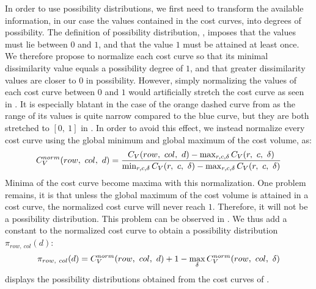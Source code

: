 In order to use possibility distributions, we first need to transform the available information, in our case the values contained in the cost curves, into degrees of possibility. The definition of possibility distribution, , imposes that the values must lie between $0$ and $1$, and that the value $1$ must be attained at least once. We therefore propose to normalize each cost curve so that its minimal dissimilarity value equals a possibility degree of $1$, and that greater dissimilarity values are closer to $0$ in possibility. However, simply normalizing the values of each cost curve between $0$ and $1$ would artificially stretch the cost curve as seen in . It is especially blatant in the case of the orange dashed curve from  as the range of its values is quite narrow compared to the blue curve, but they are both stretched to $[0,~1]$ in . In order to avoid this effect, we instead normalize every cost curve using the global minimum and global maximum of the cost volume, as:
\begin{align}
	C_V^{norm}(row, ~col, ~d) = \dfrac{C_V(row, ~col, ~d) - \max_{r,c,\delta}C_V(r,~c,~\delta)}{\min_{r,c,\delta}C_V(r,~c,~\delta) - \max_{r,c,\delta}C_V(r,~c,~\delta)}\label{eq:normalized_cost_curve}
\end{align}
Minima of the cost curve become maxima with this normalization. One problem remains, it is that unless the global maximum of the cost volume is attained in a cost curve, the normalized cost curve will never reach $1$. Therefore, it will not be a possibility distribution. This problem can be observed in . We thus add a constant to the normalized cost curve to obtain a possibility distribution $\pi_{row,~col}(d)$:
\begin{align}
	\pi_{row,~col}(d) = C_V^{norm}(row, ~col, ~d) + 1 - \max_\delta C_V^{norm}(row, ~col, ~\delta)\label{eq:possibility_cost_curve}
\end{align}
 displays the possibility distributions obtained from the cost curves of .

